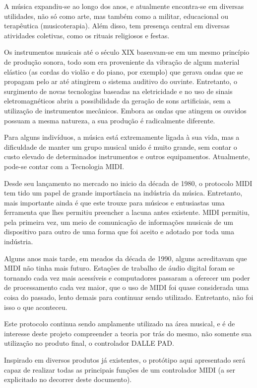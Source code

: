         A música expandiu-se ao longo dos anos, e atualmente encontra-se em diversas utilidades, não só como arte, mas também como a militar, educacional ou terapêutica (musicoterapia). Além disso, tem presença central em diversas atividades coletivas, como os rituais religiosos e festas.~\cite{PPD}
        
        Os instrumentos musicais até o século XIX baseavam-se em um mesmo princípio de produção sonora, todo som era proveniente da vibração de algum material elástico (as cordas do violão e do piano, por exemplo) que gerava ondas que se propagam pelo ar até atingirem o sistema auditivo do ouvinte. Entretanto, o surgimento de novas tecnologias baseadas na eletricidade e no uso de sinais eletromagnéticos abriu a possibilidade da geração de sons artificiais, sem a utilização de instrumentos mecânicos. Embora as ondas que atingem os ouvidos possuam a mesma natureza, a sua produção é radicalmente diferente.~\cite{SANTINI2005}
        
        Para alguns indivíduos, a música está extremamente ligada à sua vida, mas a dificuldade de manter um grupo musical unido é muito grande, sem contar o custo elevado de determinados instrumentos e outros equipamentos. Atualmente, pode-se contar com a Tecnologia MIDI.

        Desde seu lançamento no mercado no inicio da década de 1980, o protocolo MIDI tem tido um papel de grande importância na indústria da música. Entretanto, mais importante ainda é que este trouxe para músicos e entusiastas uma ferramenta que lhes permitiu preencher a lacuna antes existente. MIDI permitiu, pela primeira vez, um meio de comunicação de informações musicais de um dispositivo para outro de uma forma que foi aceito e adotado por toda uma indústria.~\cite{Guerin}

        Alguns anos mais tarde, em meados da década de 1990, alguns acreditavam que MIDI não tinha mais futuro. Estações de trabalho de áudio digital foram se tornando cada vez mais acessíveis e computadores passaram a oferecer um poder de processamento cada vez maior, que o uso de MIDI foi quase considerada uma coisa do passado, lento demais para continuar sendo utilizado. Entretanto, não foi isso o que aconteceu.

        Este protocolo continua sendo amplamente utilizado na área musical, e é de interesse deste projeto compreender a teoria por trás do mesmo, não somente sua utilização no produto final, o controlador DALLE PAD.
        
        Inspirado em diversos produtos já existentes, o protótipo aqui apresentado será capaz de realizar todas as principais funções de um controlador MIDI (a ser explicitado no decorrer deste documento).

